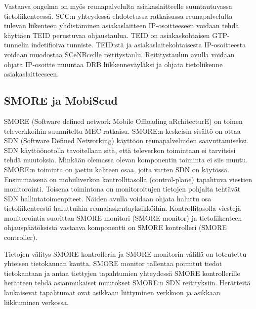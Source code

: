 \documentclass[finnish]{tktltiki2}
\theoremstyle{definition}
\theoremstyle{remark}
\begin{document}
Vastaava ongelma on myös reunapalvelulta asiakaslaitteelle suuntautuvassa tietoliikenteessä.
SCC:n yhteydessä ehdotetussa ratkaisussa reunapalvelulta tulevan liikenteen yhdistäminen asiakaslaitteen IP-osoitteeseen voidaan tehdä käyttäen TEID perustuvaa ohjaustaulua.
TEID on asiakaskohtaisen GTP-tunnelin indetifioiva tunniste.
TEID:stä ja asiakaslaitekohtaisesta IP-osoitteesta voidaan muodostaa SCeNBce:lle reititystaulu. 
Reititystaulun avulla voidaan ohjata IP-osoitte muuntaa DRB liikkenneväyläksi ja ohjata tietoliikenne asiakaslaitteeseen.

 
\subsection{SMORE ja MobiScud}
SMORE (Software defined network Mobile Offloading aRchitecturE) on toinen televerkkoihin suunniteltu MEC ratkaisu. \cite{cho2014smore}
SMORE:n keskeisin sisältö on ottaa SDN (Software Defined Networking) käyttöön reunapalveluiden saavuttamiseksi. SDN käyttöönotolla tavoitellaan sitä, että televerkon toimintaan ei tarvitsisi tehdä muutoksia. Minkään olemassa olevan komponentin toiminta ei siis muutu. 
SMORE:n toiminta on jaettu kahteen osaa, joita varten SDN on käytössä. 
Ensimmäisenä on mobiiliverkon kontrollitasolla (control-plane) tapahtuva viestien monitorointi. 
Toisena toimintona on monitoroitujen tietojen pohjalta tehtävät SDN hallintatoimenpiteet. Näiden avulla voidaan ohjata haluttu osa tietoliikenteestä haluttuihin reunalaskentayksikköihin.
Kontrollitasolla viestejä monitorointia suorittaa SMORE monitori (SMORE monitor) ja tietoliikenteen ohjauspäätöksistä vastaava komponentti on SMORE kontrolleri (SMORE controller).

Tietojen välitys SMORE kontrollerin ja SMORE monitorin välillä on toteutettu yhteisen tietokannan kautta. SMORE monitor tallentaa poimitut tiedot tietokantaan ja antaa tiettyjen tapahtumien yhteydessä SMORE kontrollerille herätteen tehdä asianmukaiset muutokset SMORE:n SDN reitityksiin. Herätteitä laukaisevat tapahtumat ovat asikkaan liittyminen verkkoon ja asikkaan liikkuminen verkossa.
\end{document}
